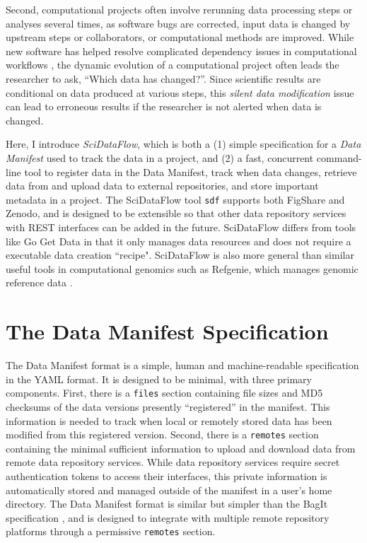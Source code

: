 \documentclass[unnumsec,webpdf,contemporary,large]{oup-authoring-template}%
\theoremstyle{thmstyleone}%
\theoremstyle{thmstyletwo}%
\theoremstyle{thmstylethree}%
\begin{document}
Second, computational projects often involve rerunning data processing
steps or analyses several times, as software bugs are corrected, input
data is changed by upstream steps or collaborators, or computational
methods are improved. While new software has helped resolve complicated
dependency issues in computational workflows \citep{Koster2012-iv}, the
dynamic evolution of a computational project often leads the researcher
to ask, ``Which data has changed?''. Since scientific results are
conditional on data produced at various steps, this \emph{silent data
modification} issue can lead to erroneous results if the researcher is
not alerted when data is changed.

Here, I introduce \emph{SciDataFlow}, which is both a (1) simple specification
for a \emph{Data Manifest} used to track the data in a project, and (2) a fast,
concurrent command-line tool to register data in the Data Manifest, track when
data changes, retrieve data from and upload data to external repositories, and
store important metadata in a project. The SciDataFlow tool \texttt{sdf}
supports both FigShare and Zenodo, and is designed to be extensible so that
other data repository services with REST interfaces \citep{Fielding2000-pe}
can be added in the future. SciDataFlow differs from tools like Go Get Data \citep{Cormier2021-jj} in that it only manages data resources and does 
not require a executable data creation ``recipe". SciDataFlow is also more 
general than similar useful tools in computational genomics such as Refgenie, 
which manages genomic reference data \citep{Stolarczyk2020-ux}.

\section{The Data Manifest Specification}\label{sec2}

The Data Manifest format is a simple, human and machine-readable
specification in the YAML format. It is designed to be minimal, with three primary components. First, there is a \texttt{files} section containing file sizes and MD5
checksums of the data versions presently ``registered'' in the manifest.
This information is needed to track when local or remotely stored data
has been modified from this registered version. Second, there is a
\texttt{remotes} section containing the minimal sufficient information
to upload and download data from remote data repository services. While
data repository services require secret authentication tokens to access
their interfaces, this private information is automatically stored and
managed outside of the manifest in a user's home directory. The Data Manifest
format is similar but simpler than the BagIt specification \citep[\url{https://datatracker.ietf.org/doc/html/rfc8493}]{Kunze2018-kz},
and is designed to integrate with multiple remote repository platforms through 
a permissive \texttt{remotes} section.
\end{document}
